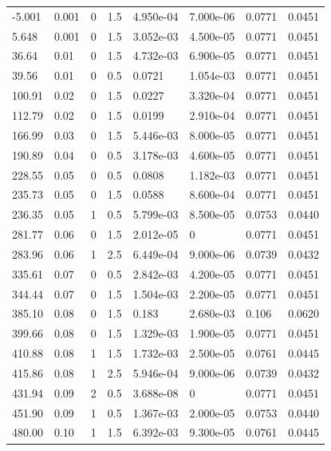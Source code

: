 \documentclass[preview]{standalone}
\begin{document}
{{\begin{tabular}{L{1.2cm}C{1.2cm} C{0.3cm}C{0.5cm} C{1.4cm}C{1.4cm} C{1.4cm}C{1.4cm}}
  -5.001  &  0.001  & 0     & 1.5 &  4.950e-04  & 7.000e-06  & 0.0771 &  0.0451   \\ 
  5.648  &  0.001  & 0     & 1.5 &  3.052e-03  & 4.500e-05  & 0.0771 &  0.0451   \\ 
  36.64  &  0.01  & 0     & 1.5 &  4.732e-03  & 6.900e-05  & 0.0771 &  0.0451   \\ 
  39.56  &  0.01  & 0     & 0.5 &  0.0721  & 1.054e-03  & 0.0771 &  0.0451   \\ 
  100.91  &  0.02  & 0     & 1.5 &  0.0227  & 3.320e-04  & 0.0771 &  0.0451   \\ 
  112.79  &  0.02  & 0     & 1.5 &  0.0199  & 2.910e-04  & 0.0771 &  0.0451   \\ 
  166.99  &  0.03  & 0     & 1.5 &  5.446e-03  & 8.000e-05  & 0.0771 &  0.0451   \\ 
  190.89  &  0.04  & 0     & 0.5 &  3.178e-03  & 4.600e-05  & 0.0771 &  0.0451   \\ 
  228.55  &  0.05  & 0     & 0.5 &  0.0808  & 1.182e-03  & 0.0771 &  0.0451   \\ 
  235.73  &  0.05  & 0     & 1.5 &  0.0588  & 8.600e-04  & 0.0771 &  0.0451   \\ 
  236.35  &  0.05  & 1     & 0.5 &  5.799e-03  & 8.500e-05  & 0.0753 &  0.0440   \\ 
  281.77  &  0.06  & 0     & 1.5 &  2.012e-05  & 0  & 0.0771 &  0.0451   \\ 
  283.96  &  0.06  & 1     & 2.5 &  6.449e-04  & 9.000e-06  & 0.0739 &  0.0432   \\ 
  335.61  &  0.07  & 0     & 0.5 &  2.842e-03  & 4.200e-05  & 0.0771 &  0.0451   \\ 
  344.44  &  0.07  & 0     & 1.5 &  1.504e-03  & 2.200e-05  & 0.0771 &  0.0451   \\ 
  385.10  &  0.08  & 0     & 1.5 &  0.183  & 2.680e-03  & 0.106 &  0.0620   \\ 
  399.66  &  0.08  & 0     & 1.5 &  1.329e-03  & 1.900e-05  & 0.0771 &  0.0451   \\ 
  410.88  &  0.08  & 1     & 1.5 &  1.732e-03  & 2.500e-05  & 0.0761 &  0.0445   \\ 
  415.86  &  0.08  & 1     & 2.5 &  5.946e-04  & 9.000e-06  & 0.0739 &  0.0432   \\ 
  431.94  &  0.09  & 2     & 0.5 &  3.688e-08  & 0  & 0.0771 &  0.0451   \\ 
  451.90  &  0.09  & 1     & 0.5 &  1.367e-03  & 2.000e-05  & 0.0753 &  0.0440   \\ 
  480.00  &  0.10  & 1     & 1.5 &  6.392e-03  & 9.300e-05  & 0.0761 &  0.0445   \\ 

\end{tabular}}}
\end{document}
